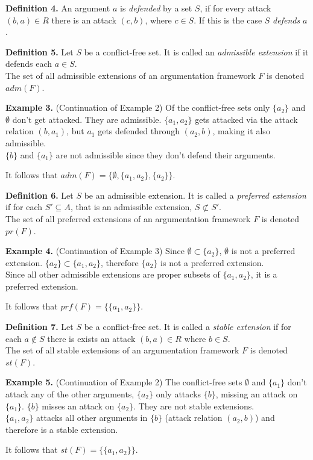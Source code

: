 \documentclass[draft,final]{vutinfth} %
\newcommand{\hl}{\par\medskip}
\newcommand{\dl}{\par\bigskip}
\begin{document}
\textbf{Definition 4.} An argument $a$ is \emph{defended} by a set $S$, if for every attack $(b,a)\in R$ there is an attack $(c,b)$, where $c\in S$. If this is the case $S$ \emph{defends} $a$.\dl

\textbf{Definition 5.} Let $S$ be a conflict-free set. It is called an \emph{admissible extension} if it defends each $a\in S$.\\
The set of all admissible extensions of an argumentation framework $F$ is denoted $adm(F)$.\dl

\textbf{Example 3.} (Continuation of Example 2) Of the conflict-free sets only $\{a_2\}$ and \(\emptyset\) don't get attacked. They are admissible. $\{a_1,a_2\}$ gets attacked via the attack relation $(b,a_1)$, but $a_1$ gets defended through $(a_2,b)$, making it also admissible.\\
$\{b\}$ and $\{a_1\}$ are not admissible since they don't defend their arguments.\hl
It follows that $adm(F)=\{\emptyset,\{a_1,a_2\},\{a_2\}\}$.\dl

\textbf{Definition 6.} Let $S$ be an admissible extension. It is called a \emph{preferred extension} if for each $S'\subseteq A$, that is an admissible extension, $S\not\subset S'$.\\
The set of all preferred extensions of an argumentation framework $F$ is denoted $pr(F)$.\dl

\textbf{Example 4.} (Continuation of Example 3) Since $\emptyset\subset\{a_2\}$, \(\emptyset\) is not a preferred extension. $\{a_2\}\subset\{a_1,a_2\}$, therefore $\{a_2\}$ is not a preferred extension.\\
Since all other admissible extensions are proper subsets of $\{a_1,a_2\}$, it is a preferred extension.\hl
It follows that $prf(F)=\{\{a_1,a_2\}\}$.\dl

\textbf{Definition 7.} Let $S$ be a conflict-free set. It is called a \emph{stable extension} if for each $a\not\in S$ there is exists an attack $(b,a)\in R$ where $b\in S$.\\
The set of all stable extensions of an argumentation framework $F$ is denoted $st(F)$.\dl

\textbf{Example 5.} (Continuation of Example 2) The conflict-free sets $\emptyset$ and $\{a_1\}$ don't attack any of the other arguments, $\{a_2\}$ only attacks $\{b\}$, missing an attack on $\{a_1\}$. $\{b\}$ misses an attack on $\{a_2\}$. They are not stable extensions.\\
$\{a_1,a_2\}$ attacks all other arguments in $\{b\}$ (attack relation $(a_2,b)$) and therefore is a stable extension.\hl
It follows that $st(F)=\{\{a_1,a_2\}\}$.\dl
\end{document}
